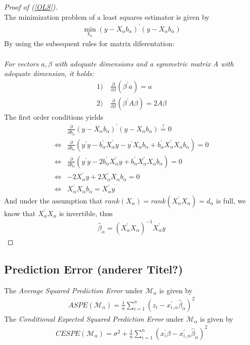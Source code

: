 \documentclass[Research_Module_ES.tex]{subfiles}
\begin{document}
\begin{proof}[Proof of (\ref{OLS})]~\\
	The minimization problem of a least squares estimator is given by
	\begin{align*}
	\min_{b_\alpha}(y-X_\alpha b_\alpha)^\prime(y-X_\alpha b_\alpha)
	\end{align*}
	By using the subsequent rules for matrix diferentation:\\\\
	\textit{For vectors $a,\beta$ with adequate dimensions and a symmetric matrix A with adequate dimension, it holds:}
	\begin{align*}
	1)&~ \frac{\partial}{\partial \beta}(\beta^\prime a)=a\\
	2)&~\frac{\partial}{\partial \beta}(\beta^\prime A\beta)=2A\beta
	\end{align*}
	The first order conditions yields
	\begin{align*}
		& \frac{\partial}{\partial b_\alpha}(y-X_\alpha b_\alpha)^\prime(y-X_\alpha b_\alpha)\stackrel{!}{=}0\\
	\Leftrightarrow & \frac{\partial}{\partial b_\alpha}(y^\prime y-b_\alpha^\prime X_\alpha^\prime y-y^\prime X_\alpha b_\alpha+b_\alpha^\prime X_\alpha^\prime X_\alpha b_\alpha)=0\\
	\Leftrightarrow & \frac{\partial}{\partial b_\alpha}(y^\prime y-2b_\alpha^\prime X_\alpha^\prime y+b_\alpha^\prime X_\alpha^\prime X_\alpha b_\alpha)=0\\
	\Leftrightarrow & -2X_\alpha^\prime y +2 X_\alpha^\prime X_\alpha b_\alpha=0\\
	\Leftrightarrow & X_\alpha^\prime X_\alpha b_\alpha=X_\alpha^\prime y
	\end{align*}
	And under the assumption that $rank(X_\alpha)=rank(X_\alpha^\prime X_\alpha)=d_\alpha$ is full, we know that $X_\alpha^\prime X_\alpha$ is invertible, thus 
	\begin{align*}
		 \hat{\beta}_\alpha=(X_\alpha^\prime X_\alpha)^{-1}X_\alpha^\prime y
	\end{align*}
\end{proof}



\subsection{Prediction Error (anderer Titel?)}
The \textit{Average Squared Prediction Error} under $\mathcal{M}_\alpha$ is given by
\begin{align*}
ASPE(\mathcal{M}_\alpha)=\frac{1}{n}\sum_{i=1}^{n}(z_i-x_{i,\alpha}^\prime\hat{\beta}_\alpha)^2
\end{align*}
The \textit{Conditional Expected Squared Prediction Error} under $\mathcal{M}_\alpha$ is given by
\begin{align*}
CESPE(\mathcal{M}_\alpha)=\sigma^2+\frac{1}{n}\sum_{i=1}^{n}(x_i^\prime\beta-x_{i,\alpha}^\prime\hat{\beta}_\alpha)^2
\end{align*}
\end{document}
